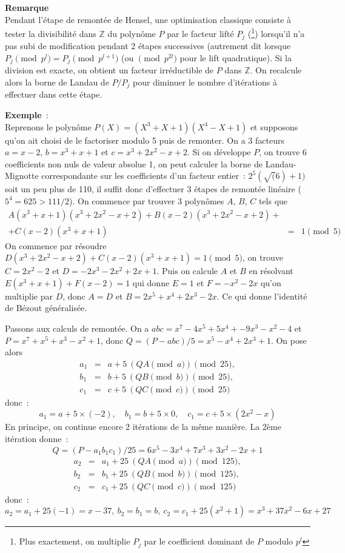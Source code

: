\documentclass[a4paper,11pt]{article}
\begin{document}
\begin{giacjshere}
{\bf Remarque}\\
Pendant l'étape de remontée de Hensel, une optimisation classique
consiste à tester la divisibilité dans $\mathbb{Z}$ du polynôme $P$ par le 
facteur lifté $P_j$ (\footnote{Plus exactement, on multiplie $P_j$ par le
coefficient dominant de $P$ modulo $p^l$})
lorsqu'il n'a pas subi de modification pendant 2 étapes successives
(autrement dit lorsque $P_j \pmod {p^l}=P_j \pmod {p^{l+1}}$ (ou
$\pmod {p^{2l}}$ pour le lift quadratique). Si la division
est exacte, on obtient un facteur irréductible de $P$ dans $\mathbb{Z}$.
On recalcule alors la borne de Landau de $P/P_j$ pour diminuer
le nombre d'itérations à effectuer dans cette étape.

{\bf Exemple}~:\\ 
Reprenons le polynôme $P(X)=(X^3+X+1)(X^4-X+1)$
et supposons qu'on ait choisi de le factoriser modulo 5 puis 
de remonter. On a 3 facteurs
$a=x-2$, $b=x^3+x+1$ et $c=x^3+2x^2-x+2$. Si on développe $P$, on trouve 6
coefficients non nuls de valeur absolue 1, 
on peut calculer la borne de Landau-Mignotte correspondante
sur les coefficients d'un facteur entier~: $2^{5} (\sqrt(6)+1)$
soit un peu plus de 110, il suffit donc d'effectuer 3 étapes de
remontée linéaire ($5^4=625>111/2$).
On commence par trouver 3 polynômes $A$, $B$, $C$ tels que
\begin{eqnarray*}
A(x^3+x+1)(x^3+2x^2-x+2)+B(x-2)(x^3+2x^2-x+2)+& & \\
+C(x-2)(x^3+x+1)&=&1 \pmod 5
\end{eqnarray*}
On commence par résoudre $D(x^3+2x^2-x+2)+C(x-2)(x^3+x+1)=1\pmod 5$,
on trouve $C=2x^2-2$ et $D=-2x^3-2x^2+2x+1$. Puis on calcule
$A$ et $B$ en résolvant $E(x^3+x+1)+F(x-2)=1$ qui donne $E=1$ et 
$F=-x^2-2x$ qu'on multiplie par $D$, donc $A=D$ et $B=2x^5+x^4+2x^3-2x$.
Ce qui donne l'identité de Bézout généralisée.

Passons aux calculs de remontée. On a $abc=x^7-4x^5+5x^4+-9x^3-x^2-4$
et $P=x^7+x^5+x^3-x^2+1$, donc $Q=(P-abc)/5=x^5-x^4+2x^3+1$. On pose
alors 
\begin{eqnarray*} 
a_1&=&a+5 \ (QA \pmod a)\pmod{25}, \\
b_1&=&b+5 \ (QB \pmod b) \pmod{25}, \\
c_1&=&c+5 \ (QC \pmod c) \pmod{25} 
\end{eqnarray*}
donc~:
\[ a_1= a+5 \times (-2), \quad b_1=b+5 \times 0, 
\quad c_1=c+5 \times (2x^2-x) \]
En principe, on continue encore 2 itérations de la même manière.
La 2ème itération donne~: 
\[ Q=(P-a_1 b_1 c_1)/25= 6x^5-3x^4+7x^3+3x^2-2x+1\] 
\begin{eqnarray*} 
a_2&=&a_1+25 \ (QA \pmod a) \pmod{125}, \\
b_2&=&b_1+25 \ (QB \pmod b) \pmod{125},\\
c_2&=&c_1+25 \ (QC \pmod c) \pmod{125}
\end{eqnarray*}
donc~:
\[ a_2=a_1 +25(-1)=x-37, \ b_2=b_1=b, \ c_2=c_1+25(x^2+1) 
=x^3+37x^2-6x+27 \]


\end{giacjshere}
\end{document}
